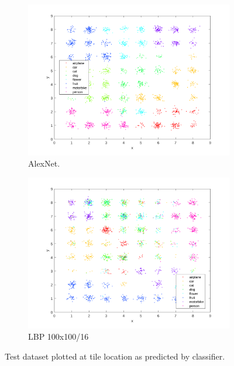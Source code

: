 \documentclass[doc/report.tex]{subfiles}
\begin{document}
\begin{figure}[h]
    \centering
    \begin{subfigure}[t]{0.9\textwidth}
        \centering
        \includegraphics[width=\textwidth]{doc/fig/som_alex.png}
        \caption{AlexNet.}
    \end{subfigure}

    \begin{subfigure}[t]{0.9\textwidth}
        \centering
        \includegraphics[width=\textwidth]{doc/fig/som_lbp.png}
        \caption{LBP 100x100/16}
    \end{subfigure}%
    \caption{Test dataset plotted at tile location as predicted by classifier.}
    \label{fig:som_tiles}
\end{figure}
\end{document}
